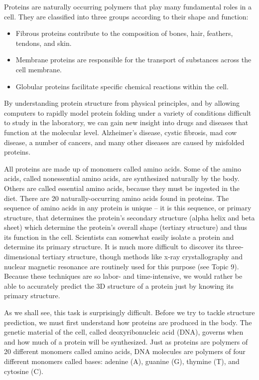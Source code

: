 Proteins are naturally occurring polymers that play many fundamental roles in a cell.  They are classified into three groups according to their shape and function:
\begin{itemize}
\item Fibrous proteins contribute to the composition of bones, hair, feathers, tendons, and skin.
\item Membrane proteins are responsible for the transport of substances across the cell membrane.
\item Globular proteins facilitate specific chemical reactions within the cell.
\end{itemize}	
By understanding protein structure from physical principles, and by allowing computers to rapidly model protein folding under a variety of conditions difficult to study in the laboratory, we can gain new insight into drugs and diseases that function at the molecular level.  Alzheimer’s disease, cystic fibrosis, mad cow disease, a number of cancers, and many other diseases are caused by misfolded proteins.

All proteins are made up of monomers called amino acids.  Some of the amino acids, called nonessential amino acids, are synthesized naturally by the body.  Others are called essential amino acids, because they must be ingested in the diet.  There are 20 naturally-occurring amino acids found in proteins.  
The sequence of amino acids in any protein is unique -- it is this sequence, or primary structure, that determines the protein's secondary structure (alpha helix and beta sheet) which determine the protein's overall shape (tertiary structure) and thus its function in the cell.  Scientists can somewhat easily isolate a protein and determine its primary structure.  It is much more difficult to discover its three-dimensional tertiary structure, though methods like x-ray crystallography and nuclear magnetic resonance are routinely used for this purpose (see Topic 9).  Because these techniques are so labor- and time-intensive, we would rather be able to accurately predict the 3D structure of a protein just by knowing its primary structure.

As we shall see, this task is surprisingly difficult.  Before we try to tackle structure prediction, we must first understand how proteins are produced in the body.  The genetic material of the cell, called deoxyribonucleic acid (DNA), governs when and how much of a protein will be synthesized.  Just as proteins are polymers of 20 different monomers called amino acids, DNA molecules are polymers of four different monomers called bases: adenine (A), guanine (G), thymine (T), and cytosine (C).

